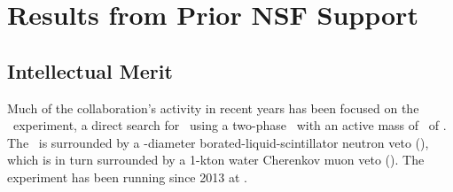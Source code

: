 \section{Results from Prior NSF Support}
\label{sec:priorresults}


\subsection{Intellectual Merit}
\label{sec:PreviousResults-IntellectualMerit}

Much of the collaboration's activity in recent years has been focused on the \DSfs\ experiment, a direct search for \WIMPs\ using a two-phase \LArTPC\ with an active mass of \DSfActiveMass\ of \LAr.  The \LArTPC\ is surrounded by a \LSVStainlessSphereDiameter-diameter borated-liquid-scintillator neutron veto (\LSV), which is in turn surrounded by a 1-kton water Cherenkov muon veto (\WCV).  The experiment has been running since 2013 at \LNGS.

